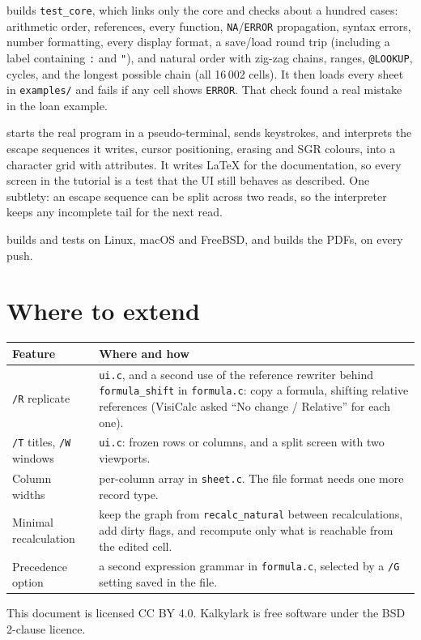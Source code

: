 \documentclass[11pt]{article}
\begin{document}
\begin{description}[style=nextline, leftmargin=1.5em]
\item[\texttt{make check}] builds \texttt{test\_core}, which links only the
  core and checks about a hundred cases: arithmetic order, references,
  every function, \texttt{NA}/\texttt{ERROR} propagation, syntax errors,
  number formatting, every display format, a save/load round trip
  (including a label containing \texttt{:} and \texttt{"}), and natural
  order with zig-zag chains, ranges, \texttt{@LOOKUP}, cycles, and the
  longest possible chain (all 16\,002 cells). It then loads every sheet in
  \texttt{examples/} and fails if any cell shows \texttt{ERROR}. That check
  found a real mistake in the loan example.
\item[\texttt{tools/screens.py}] starts the real program in a
  pseudo-terminal, sends keystrokes, and interprets the escape sequences it
  writes, cursor positioning, erasing and SGR colours, into a character
  grid with attributes. It writes LaTeX for the documentation, so every
  screen in the tutorial is a test that the UI still behaves as described.
  One subtlety: an escape sequence can be split across two reads, so the
  interpreter keeps any incomplete tail for the next read.
\item[CI] builds and tests on Linux, macOS and FreeBSD, and builds the
  PDFs, on every push.
\end{description}

\section{Where to extend}

\begin{center}
\begin{tabularx}{\linewidth}{@{}lX@{}}
\toprule
\textbf{Feature} & \textbf{Where and how} \\
\midrule
\texttt{/R} replicate & \texttt{ui.c}, and a second use of the reference
  rewriter behind \texttt{formula\_shift} in \texttt{formula.c}: copy a
  formula, shifting relative references (VisiCalc asked ``No change /
  Relative'' for each one). \\
\texttt{/T} titles, \texttt{/W} windows & \texttt{ui.c}: frozen rows or
  columns, and a split screen with two viewports. \\
Column widths & per-column array in \texttt{sheet.c}. The file format
  needs one more record type. \\
Minimal recalculation & keep the graph from \texttt{recalc\_natural}
  between recalculations, add dirty flags, and recompute only what is
  reachable from the edited cell. \\
Precedence option & a second expression grammar in \texttt{formula.c},
  selected by a \texttt{/G} setting saved in the file. \\
\bottomrule
\end{tabularx}
\end{center}

\vfill
{\small This document is licensed CC BY 4.0. Kalkylark is free software
under the BSD 2-clause licence.}
\end{document}
